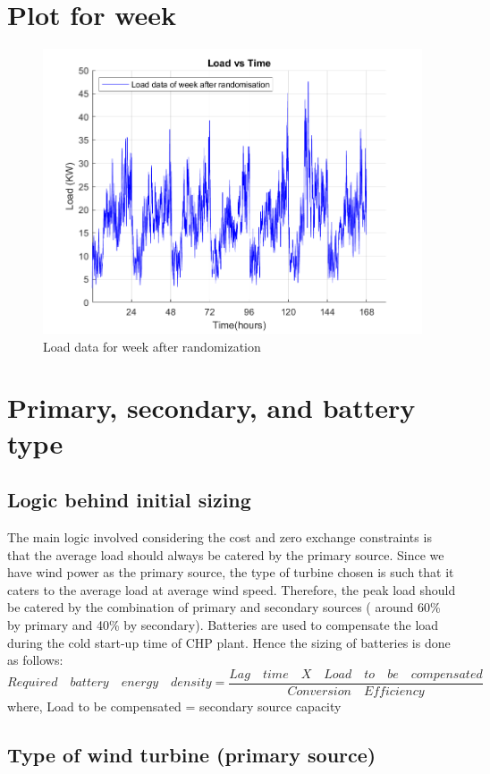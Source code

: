 \section{Plot for week}
\begin{figure} [H]
    \centering
    \includegraphics[width=0.5 \linewidth]{w1/images/Load_after_randomization.png}
    \caption{Load data for week after randomization}
    \label{fig:load_for_week}
\end{figure}

\section{Primary, secondary, and battery type}


\subsection{Logic behind initial sizing}
The main logic involved considering the cost and zero exchange constraints is that the average load should always be catered by the primary source. Since we have wind power as the primary source, the type of turbine chosen is such that it caters to the average load at average wind speed. Therefore, the peak load should be catered by the combination of primary and secondary sources ( around 60\% by primary and 40\% by secondary).   
Batteries are used to compensate the load during the cold start-up time of CHP plant. Hence the sizing of batteries is done as follows:
 \begin{equation}
    Required\quad battery\quad energy\quad  density = \frac{Lag\quad time\quad X\quad Load\quad to\quad be\quad compensated}{Conversion\quad Efficiency} 
 \end{equation}
 where,  Load to be compensated = secondary source capacity


\subsection{Type of wind turbine (primary source)}

